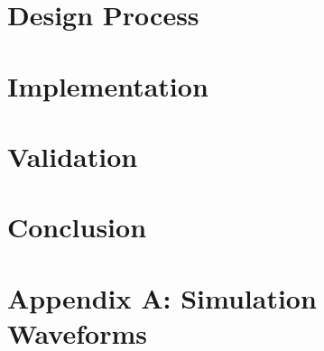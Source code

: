 \documentclass[12pt,letterpaper,titlepage]{article}
\begin{document}
\begin{raggedright}
\section{Design Process}


\section{Implementation}


\section{Validation}


\section{Conclusion}


\clearpage

\section{Appendix A: Simulation Waveforms}

\clearpage



\end{raggedright}
\end{document}
